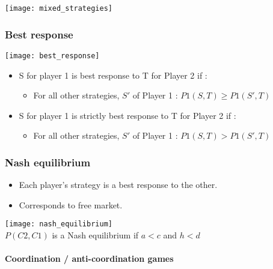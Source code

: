 \begin{table}[H]
    \centering
    \texttt{[image: mixed\_strategies]}
\end{table}

\subsubsection{Best response}

\begin{table}[H]
    \centering
    \texttt{[image: best\_response]}
\end{table}

\begin{itemize}
\item S for player 1 is best response to T for Player 2 if :
	\begin{itemize}
	\item For all other strategies, $S'$ of Player 1 : $P1(S, T) \geq P1(S', T)$
	\end{itemize}
\item S for player 1 is strictly best response to T for Player 2 if :
	\begin{itemize}
	\item For all other strategies, $S'$ of Player 1 : $P1(S, T) > P1(S', T)$
	\end{itemize}
\end{itemize}

\newpage
\subsubsection{Nash equilibrium}

\begin{itemize}
\item Each player's strategy is a best response to the other.
\item Corresponds to free market.
\end{itemize}

\begin{table}[H]
    \centering
    \texttt{[image: nash\_equilibrium]}\\
    $P(C2, C1)$ is a Nash equilibrium if $a < c$ and $h < d$
\end{table}

\paragraph{Coordination / anti-coordination games}

